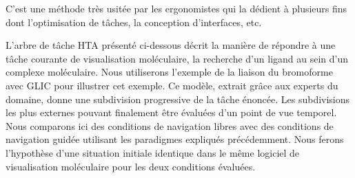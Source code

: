 C'est une méthode très usitée par les ergonomistes qui la dédient à plusieurs fins dont l'optimisation de tâches, la conception d'interfaces, etc.


L'arbre de tâche HTA présenté ci-dessous décrit la manière de répondre à une tâche courante de visualisation moléculaire, la recherche d'un ligand au sein d'un complexe moléculaire. Nous utiliserons l'exemple de la liaison du bromoforme avec GLIC pour illustrer cet exemple. Ce modèle, extrait grâce aux experts du domaine, donne une subdivision progressive de la tâche énoncée. Les subdivisions les plus externes pouvant finalement être évaluées d'un point de vue temporel. Nous comparons ici des conditions de navigation libres avec des conditions de navigation guidée utilisant les paradigmes expliqués précédemment. Nous ferons l'hypothèse d'une situation initiale identique dans le même logiciel de visualisation moléculaire pour les deux conditions évaluées.
\\
\\
\\
\\
\\

